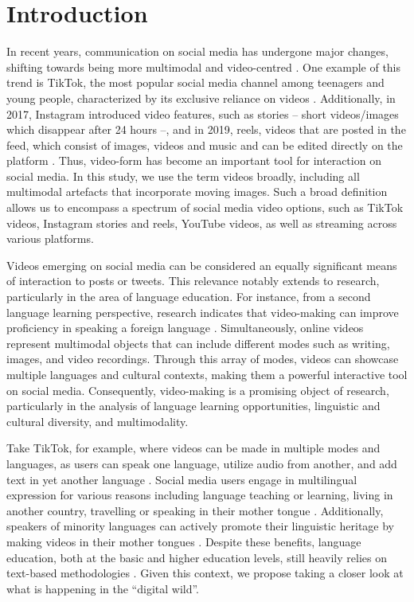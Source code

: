 \section{Introduction}\label{sec-introduction}

In recent years, communication on social media has undergone major
changes, shifting towards being more multimodal and video-centred \cite{yus2023}. One example of this trend is TikTok, the most popular social
media channel among teenagers and young people, characterized by its
exclusive reliance on videos \cite{aslam2022}. Additionally, in 2017,
Instagram introduced video features, such as stories -- short
videos/images which disappear after 24 hours --, and in 2019, reels,
videos that are posted in the feed, which consist of images, videos and
music and can be edited directly on the platform \cite{instagram2020}.
Thus, video-form has become an important tool for interaction on social
media. In this study, we use the term
\textquotesingle videos\textquotesingle{} broadly, including all
multimodal artefacts that incorporate moving images. Such a broad
definition allows us to encompass a spectrum of social media video
options, such as TikTok videos, Instagram stories and reels, YouTube
videos, as well as streaming across various platforms.

Videos emerging on social media can be considered an equally significant
means of interaction to posts or tweets. This relevance notably extends
to research, particularly in the area of language education. For
instance, from a second language learning perspective, research
indicates that video-making can improve proficiency in speaking a
foreign language \cite{cassany2021}. Simultaneously, online
videos represent multimodal objects that can include different modes
such as writing, images, and video recordings. Through this array of
modes, videos can showcase multiple languages and cultural contexts,
making them a powerful interactive tool on social media. Consequently,
video-making is a promising object of research, particularly in the
analysis of language learning opportunities, linguistic and cultural
diversity, and multimodality.

Take TikTok, for example, where videos can be made in multiple modes and
languages, as users can speak one language, utilize audio from another,
and add text in yet another language \cite{vazquez2022}.
Social media users engage in multilingual expression for various reasons
including language teaching or learning, living in another country,
travelling or speaking in their mother tongue \cite{chang2019}.
Additionally, speakers of minority languages can actively promote their
linguistic heritage by making videos in their mother tongues \cite{stern2017}. Despite these benefits, language education, both at the basic and
higher education levels, still heavily relies on text-based
methodologies \cite{chik2021}. Given this context, we propose
taking a closer look at what is happening in the ``digital wild''.

